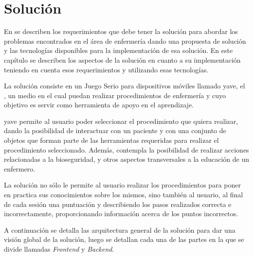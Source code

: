 \chapter{Solución}
\label{chap:solucion}



En  se describen los requerimientos que
debe tener la solución para abordar los problemas encontrados en el área de
enfermería dando una propuesta de solución y las tecnologías disponibles para la
implementación de esa solución. En este capítulo se describen los aspectos de la
solución en cuanto a su implementación teniendo en cuenta esos requerimientos y
utilizando esas tecnologías.

La solución consiste en un Juego Serio para dispositivos móviles llamado
\Gls{yave}, el , un medio en el cual puedan realizar
procedimientos de enfermería y cuyo objetivo es servir como herramienta de apoyo
en el aprendizaje.

\Gls{yave} permite al usuario poder
seleccionar el procedimiento que quiera realizar, dando la posibilidad de
interactuar con un paciente y con una conjunto de objetos que forman parte de
las herramientas requeridas para realizar el procedimiento seleccionado. Además,
contempla la posibilidad de realizar acciones relacionadas a la bioseguridad, y
otros aspectos transversales a la educación de un enfermero.

La solución no sólo le permite al usuario realizar los procedimientos para poner
en practica sus conocimientos sobre los mismos, sino también
 al usuario,  al final de cada
sesión una puntuación y describiendo los pasos realizados correcta e
incorrectamente, proporcionando información acerca de los puntos incorrectos.

A continuación se detalla las arquitectura general de la solución para 
dar una visión global de la solución, luego se detallan cada una de las partes en 
la que se divide llamadas \emph{Frontend} y \emph{Backend}.


